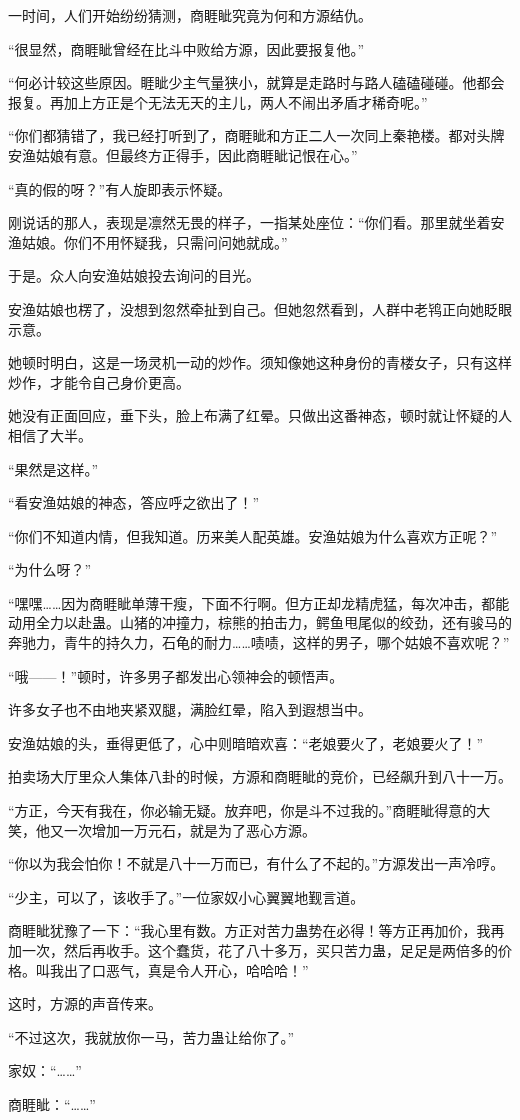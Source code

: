 \begin{this_body}
一时间，人们开始纷纷猜测，商睚眦究竟为何和方源结仇。

“很显然，商睚眦曾经在比斗中败给方源，因此要报复他。”

“何必计较这些原因。睚眦少主气量狭小，就算是走路时与路人磕磕碰碰。他都会报复。再加上方正是个无法无天的主儿，两人不闹出矛盾才稀奇呢。”

“你们都猜错了，我已经打听到了，商睚眦和方正二人一次同上秦艳楼。都对头牌安渔姑娘有意。但最终方正得手，因此商睚眦记恨在心。”

“真的假的呀？”有人旋即表示怀疑。

刚说话的那人，表现是凛然无畏的样子，一指某处座位：“你们看。那里就坐着安渔姑娘。你们不用怀疑我，只需问问她就成。”

于是。众人向安渔姑娘投去询问的目光。

安渔姑娘也楞了，没想到忽然牵扯到自己。但她忽然看到，人群中老鸨正向她眨眼示意。

她顿时明白，这是一场灵机一动的炒作。须知像她这种身份的青楼女子，只有这样炒作，才能令自己身价更高。

她没有正面回应，垂下头，脸上布满了红晕。只做出这番神态，顿时就让怀疑的人相信了大半。

“果然是这样。”

“看安渔姑娘的神态，答应呼之欲出了！”

“你们不知道内情，但我知道。历来美人配英雄。安渔姑娘为什么喜欢方正呢？”

“为什么呀？”

“嘿嘿……因为商睚眦单薄干瘦，下面不行啊。但方正却龙精虎猛，每次冲击，都能动用全力以赴蛊。山猪的冲撞力，棕熊的拍击力，鳄鱼甩尾似的绞劲，还有骏马的奔驰力，青牛的持久力，石龟的耐力……啧啧，这样的男子，哪个姑娘不喜欢呢？”

“哦——！”顿时，许多男子都发出心领神会的顿悟声。

许多女子也不由地夹紧双腿，满脸红晕，陷入到遐想当中。

安渔姑娘的头，垂得更低了，心中则暗暗欢喜：“老娘要火了，老娘要火了！”

拍卖场大厅里众人集体八卦的时候，方源和商睚眦的竞价，已经飙升到八十一万。

“方正，今天有我在，你必输无疑。放弃吧，你是斗不过我的。”商睚眦得意的大笑，他又一次增加一万元石，就是为了恶心方源。

“你以为我会怕你！不就是八十一万而已，有什么了不起的。”方源发出一声冷哼。

“少主，可以了，该收手了。”一位家奴小心翼翼地觐言道。

商睚眦犹豫了一下：“我心里有数。方正对苦力蛊势在必得！等方正再加价，我再加一次，然后再收手。这个蠢货，花了八十多万，买只苦力蛊，足足是两倍多的价格。叫我出了口恶气，真是令人开心，哈哈哈！”

这时，方源的声音传来。

“不过这次，我就放你一马，苦力蛊让给你了。”

家奴：“……”

商睚眦：“……”

\end{this_body}

